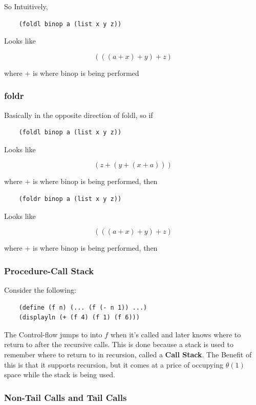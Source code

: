 \documentclass[12pt]{article}
\begin{document}
So Intuitively, 

\begin{lstlisting}
	(foldl binop a (list x y z))
\end{lstlisting}

Looks like

$$(((a + x) + y) + z)$$

where $+$ is where binop is being performed

\subsubsection{foldr}

Basically in the opposite direction of foldl, so if

\begin{lstlisting}
	(foldl binop a (list x y z))
\end{lstlisting}

Looks like

$$(z + (y + (x+a)))$$

where $+$ is where binop is being performed, then

\begin{lstlisting}
	(foldr binop a (list x y z))
\end{lstlisting}

Looks like

$$(((a + x) + y) + z)$$

where $+$ is where binop is being performed, then

\subsubsection{Procedure-Call Stack}

Consider the following:

\begin{lstlisting}
	(define (f n) (... (f (- n 1)) ...)
	(displayln (+ (f 4) (f 1) (f 6)))
\end{lstlisting}

The Control-flow jumps to into $f$ when it's called and later knows where to return to after the recursive calls. This is done because a stack is used to remember where to return to in recursion, called a \textbf{Call Stack}. The Benefit of this is that it supports recursion, but it comes at a price of occupying $\theta (1)$ space while the stack is being used.

\subsubsection{Non-Tail Calls and Tail Calls}
\end{document}
